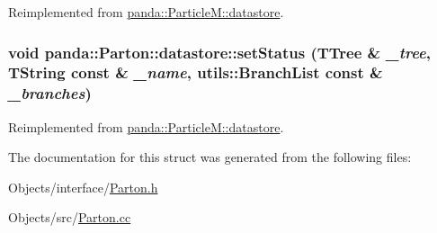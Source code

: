 Reimplemented from \hyperlink{structpanda_1_1ParticleM_1_1datastore_ab9f9e7afb145c12941baa10892ed1811}{panda::ParticleM::datastore}.\hypertarget{structpanda_1_1Parton_1_1datastore_a923a18c356315d4083798fe11bb2c942}{
\subsubsection[{setStatus}]{\setlength{\rightskip}{0pt plus 5cm}void panda::Parton::datastore::setStatus (TTree \& {\em \_\-tree}, \/  TString const \& {\em \_\-name}, \/  {\bf utils::BranchList} const \& {\em \_\-branches})}}
\label{structpanda_1_1Parton_1_1datastore_a923a18c356315d4083798fe11bb2c942}


Reimplemented from \hyperlink{structpanda_1_1ParticleM_1_1datastore_a0329bec2c84d16ff16e15824890e7a86}{panda::ParticleM::datastore}.

The documentation for this struct was generated from the following files:\begin{DoxyCompactItemize}
\item 
Objects/interface/\hyperlink{Parton_8h}{Parton.h}\item 
Objects/src/\hyperlink{Parton_8cc}{Parton.cc}\end{DoxyCompactItemize}
